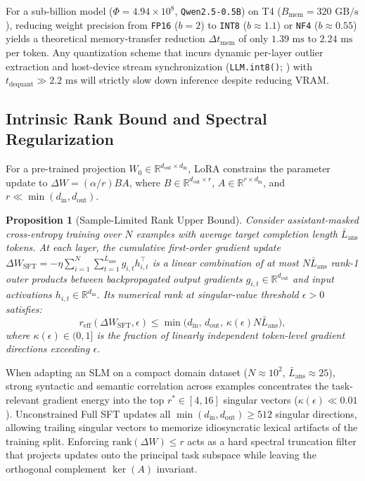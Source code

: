 \documentclass[10pt,a4paper,twocolumn]{article}
\newtheorem{proposition}{Proposition}
\begin{document}
For a sub-billion model ($\Phi = 4.94 \times 10^8$, \texttt{Qwen2.5-0.5B}) on T4 ($B_{\text{mem}} = 320\text{ GB/s}$), reducing weight precision from \texttt{FP16} ($b=2$) to \texttt{INT8} ($b \approx 1.1$) or \texttt{NF4} ($b \approx 0.55$) yields a theoretical memory-transfer reduction $\Delta t_{\text{mem}}$ of only $1.39\text{ ms}$ to $2.24\text{ ms}$ per token. Any quantization scheme that incurs dynamic per-layer outlier extraction and host-device stream synchronization (\texttt{LLM.int8()}; \citealp{dettmers2022llm}) with $t_{\text{dequant}} \gg 2.2\text{ ms}$ will strictly slow down inference despite reducing VRAM.

\subsection{Intrinsic Rank Bound and Spectral Regularization}
\label{sec:rank_theory}

For a pre-trained projection $W_0 \in \mathbb{R}^{d_{\text{out}} \times d_{\text{in}}}$, LoRA \citep{hu2022lora} constrains the parameter update to $\Delta W = (\alpha / r) B A$, where $B \in \mathbb{R}^{d_{\text{out}} \times r}$, $A \in \mathbb{R}^{r \times d_{\text{in}}}$, and $r \ll \min(d_{\text{in}}, d_{\text{out}})$.

\begin{proposition}[Sample-Limited Rank Upper Bound]
\label{prop:rank}
Consider assistant-masked cross-entropy training over $N$ examples with average target completion length $\bar{L}_{\text{ans}}$ tokens. At each layer, the cumulative first-order gradient update $\Delta W_{\text{SFT}} = -\eta \sum_{i=1}^{N} \sum_{t=1}^{\bar{L}_{\text{ans}}} g_{i,t} h_{i,t}^\top$ is a linear combination of at most $N \bar{L}_{\text{ans}}$ rank-1 outer products between backpropagated output gradients $g_{i,t} \in \mathbb{R}^{d_{\text{out}}}$ and input activations $h_{i,t} \in \mathbb{R}^{d_{\text{in}}}$. Its numerical rank at singular-value threshold $\epsilon > 0$ satisfies:
\begin{equation}
  r_{\text{eff}}(\Delta W_{\text{SFT}}, \epsilon) \le \min\!\big(d_{\text{in}},\, d_{\text{out}},\, \kappa(\epsilon) N \bar{L}_{\text{ans}}\big),
  \label{eq:rank_bound}
\end{equation}
where $\kappa(\epsilon) \in (0, 1]$ is the fraction of linearly independent token-level gradient directions exceeding $\epsilon$.
\end{proposition}
When adapting an SLM on a compact domain dataset ($N \approx 10^2$, $\bar{L}_{\text{ans}} \approx 25$), strong syntactic and semantic correlation across examples concentrates the task-relevant gradient energy into the top $r^* \in [4, 16]$ singular vectors ($\kappa(\epsilon) \ll 0.01$). Unconstrained Full SFT updates all $\min(d_{\text{in}}, d_{\text{out}}) \ge 512$ singular directions, allowing trailing singular vectors to memorize idiosyncratic lexical artifacts of the training split. Enforcing $\text{rank}(\Delta W) \le r$ acts as a hard spectral truncation filter that projects updates onto the principal task subspace while leaving the orthogonal complement $\ker(A)$ invariant.
\end{document}
